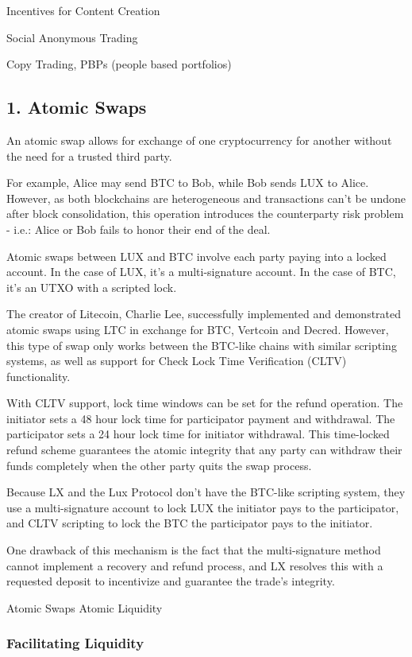 \documentclass[11pt]{article}
\begin{document}
Incentives for Content Creation


Social Anonymous Trading


Copy Trading, PBPs (people based portfolios)


\subsection{1. Atomic Swaps}

An atomic swap allows for exchange of one cryptocurrency for another without the need for a trusted third party.


For example, Alice may send BTC to Bob, while Bob sends LUX to Alice. However, as both blockchains are heterogeneous and transactions can't be undone after block consolidation, this operation introduces the counterparty risk problem - i.e.: Alice or Bob fails to honor their end of the deal.


Atomic swaps between LUX and BTC involve each party paying into a locked account. In the case of LUX, it's a multi-signature account. In the case of BTC, it's an UTXO with a scripted lock.


The creator of Litecoin, Charlie Lee, successfully implemented and demonstrated atomic swaps using LTC in exchange for BTC, Vertcoin and Decred. However, this type of swap only works between the BTC-like chains with similar scripting systems, as well as support for Check Lock Time Verification (CLTV) functionality.


With CLTV support, lock time windows can be set for the refund operation. The initiator sets a 48 hour lock time for participator payment and withdrawal. The participator sets a 24 hour lock time for initiator withdrawal. This time-locked refund scheme guarantees the atomic integrity that any party can withdraw their funds completely when the other party quits the swap process.


Because LX and the Lux Protocol don't have the BTC-like scripting system, they use a multi-signature account to lock LUX the initiator pays to the participator, and CLTV scripting to lock the BTC the participator pays to the initiator.


One drawback of this mechanism is the fact that the multi-signature method cannot implement a recovery and refund process, and LX resolves this with a requested deposit to incentivize and guarantee the trade's integrity.


Atomic Swaps				Atomic Liquidity


\subsubsection{Facilitating Liquidity}
\end{document}
